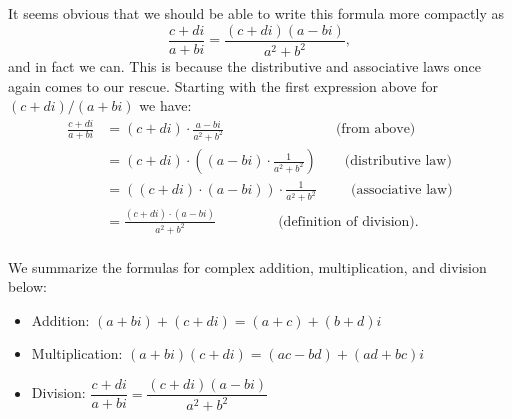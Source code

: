 It seems obvious that we should be able to write this formula more compactly as
\[\frac{c+di}{a+bi}=
 \frac{(c+di)(a-bi)}{a^2 + b^2}, \]
and in fact we can. This is because the distributive and associative laws once again comes to our rescue. Starting with the first expression above for $(c + di) / (a + bi)$ we have:
\begin{align*}
\frac{c+di}{a+bi}&=
(c + di) \cdot \frac{a-bi}{a^2 + b^2} \qquad \qquad \qquad  \qquad \textrm{(from above)}\\
& = (c + di) \cdot \left( (a-bi) \cdot \frac{1}{a^2 + b^2}\right) \qquad \textrm{(distributive law)}\\
& = ((c + di) \cdot  (a-bi)) \cdot \frac{1}{a^2 + b^2} \qquad ~~\textrm{(associative law)}\\
& = \frac{(c + di) \cdot  (a-bi)}{a^2 + b^2} \qquad \qquad ~~\textrm{(definition of division).}\\
\end{align*}

We summarize the formulas for complex addition, multiplication, and division below:
\begin{itemize}

\item
Addition:  $(a+bi)+(c+di) = (a+c)+(b+d)i$

\item
Multiplication:  $(a+bi)(c+di) = (ac-bd)+(ad+bc)i$

\item
Division:  $\dfrac{c+di}{a+bi} = \dfrac{(c+di)(a-bi)}{a^2+b^2}$
\end{itemize}

